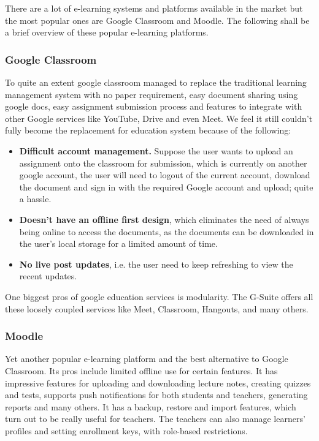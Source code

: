 There are a lot of e-learning systems and platforms available in the market 
but the most popular ones are Google Classroom and Moodle. 
The following shall be a brief overview of these popular e-learning platforms.

\subsubsection{Google Classroom}
To quite an extent google classroom managed to replace the traditional 
learning management system with no paper requirement, easy document sharing using google docs, 
easy assignment submission process and features to integrate with other Google services 
like YouTube, Drive and even Meet. 
We feel it still couldn’t fully become the replacement for education system because of the following:

\begin{itemize}
    \item \textbf{Difficult account management.} Suppose the user wants to upload an assignment onto the classroom for submission, 
    which is currently on another google account, the user will need to logout of the current account, 
    download the document and sign in with the required Google account and upload; quite a hassle.
    \item \textbf{Doesn’t have an offline first design}, which eliminates the need of always being online to access the documents, 
    as the documents can be downloaded in the user’s local storage for a limited amount of time.
    \item \textbf{No live post updates}, i.e. the user need to keep refreshing to view the recent updates.
\end{itemize}

One biggest pros of google education services is modularity. The G-Suite offers all these 
loosely coupled services like Meet, Classroom, Hangouts, and many others.

\subsubsection{Moodle}
Yet another popular e-learning platform and the best alternative to Google Classroom. 
Its pros include limited offline use for certain features. It has impressive features 
for  uploading and downloading lecture notes, creating quizzes and tests, supports push 
notifications for both students and teachers, generating reports and many others. 
It has a  backup, restore and import features, which turn out to be really useful for teachers. 
The teachers can also manage learners' profiles and setting enrollment keys, with role-based restrictions.

